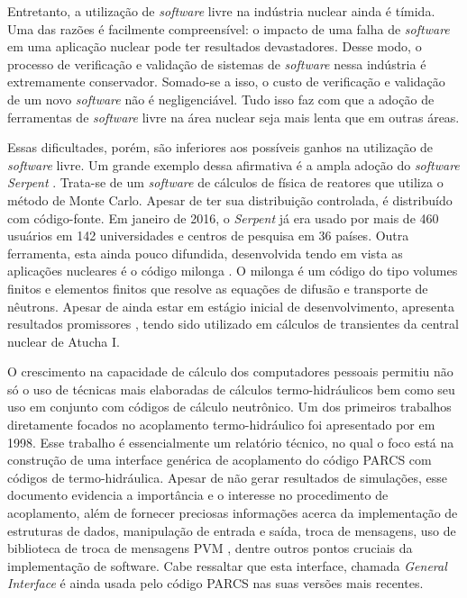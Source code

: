 Entretanto, a utilização de \textit{software} livre na indústria nuclear ainda é tímida.
Uma das razões é facilmente compreensível: o impacto de uma falha de \textit{software}
em uma aplicação nuclear pode ter resultados devastadores. Desse modo, o processo de
verificação e validação de sistemas de \textit{software} nessa indústria é extremamente
conservador. Somado-se a isso, o custo de verificação e validação de um novo \textit{software}
não é negligenciável. Tudo isso faz com que a adoção de ferramentas de \textit{software}
livre na área nuclear seja mais lenta que em outras áreas.

Essas dificultades, porém, são inferiores aos possíveis ganhos na utilização de
\textit{software} livre. Um grande exemplo dessa afirmativa é a ampla adoção
do \textit{software Serpent} \cite{Serpent2013}. Trata-se de um \textit{software}
de cálculos de física de reatores que utiliza o método de Monte Carlo. Apesar
de ter sua distribuição controlada, é distribuído com código-fonte. Em janeiro
de 2016, o \textit{Serpent} já era usado por mais de 460 usuários em 142 universidades
e centros de pesquisa em 36 países. Outra ferramenta, esta ainda pouco difundida,
desenvolvida tendo em vista as aplicações nucleares é o código milonga \cite{Theler2015}.
O milonga é um código do tipo volumes finitos e elementos finitos que resolve as equações
de difusão e transporte de nêutrons. Apesar de ainda estar em estágio inicial de
desenvolvimento, apresenta resultados promissores \cite{Theler2014b}, tendo sido
utilizado em cálculos de transientes da central nuclear de Atucha I.


O crescimento na capacidade de cálculo dos computadores pessoais permitiu não só o uso 
de técnicas mais elaboradas de cálculos termo-hidráulicos bem como seu uso em conjunto 
com códigos de cálculo neutrônico. Um dos primeiros trabalhos diretamente focados no 
acoplamento termo-hidráulico foi apresentado por \cite{Barber98} em 1998. Esse trabalho 
é essencialmente um relatório técnico, no qual o foco está na construção de uma interface 
genérica de acoplamento do código PARCS com códigos de termo-hidráulica. Apesar de não 
gerar resultados de simulações, esse documento evidencia a importância e o interesse 
no procedimento de acoplamento, além de fornecer preciosas informações acerca da 
implementação de estruturas de dados, manipulação de entrada e saída, troca de mensagens, 
uso de biblioteca de troca de mensagens PVM \cite{Geist94}, dentre outros pontos cruciais
da implementação de software. Cabe ressaltar que esta interface, 
chamada \textit{General Interface} é ainda usada pelo código PARCS nas suas versões mais 
recentes. 

